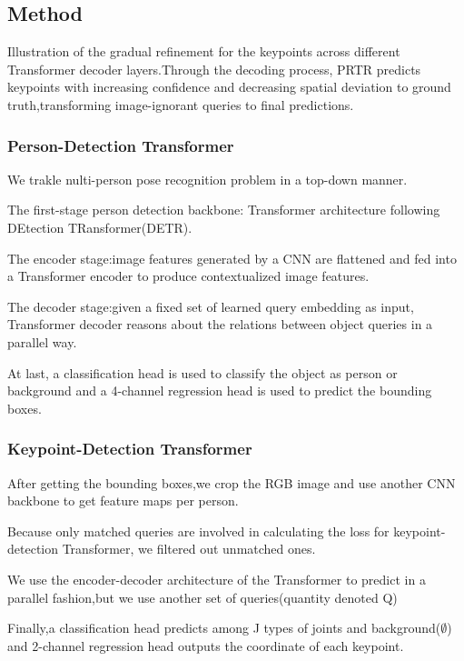 \documentclass[11pt]{article}
\begin{document}
\subsection{Method}

Illustration of the gradual refinement for the keypoints across different Transformer decoder layers.Through the decoding process, PRTR predicts keypoints with increasing confidence and decreasing spatial deviation to ground truth,transforming image-ignorant queries to final predictions.

\subsubsection{Person-Detection Transformer}

We trakle nulti-person pose recognition problem in a top-down manner.

The first-stage person detection backbone: Transformer architecture following DEtection TRansformer(DETR).

The encoder stage:image features generated by a CNN are flattened and fed into a Transformer encoder to produce contextualized image features.

The decoder stage:given a fixed set of learned query embedding as input, Transformer decoder reasons about the relations between object queries in a parallel way.

At last, a classification head is used to classify the object as person or background and a 4-channel regression head is used to predict the bounding boxes.

\subsubsection{Keypoint-Detection Transformer}

After getting the bounding boxes,we crop the RGB image and use another CNN backbone to get feature maps per person.

Because only matched queries are involved in calculating the loss for keypoint-detection Transformer, we filtered out unmatched ones.

We use the encoder-decoder architecture of the Transformer to predict in a parallel fashion,but we use another set of queries(quantity denoted Q)

Finally,a classification head predicts among J types of joints and background($\emptyset$) and 2-channel regression head outputs the coordinate of each keypoint.
\end{document}
